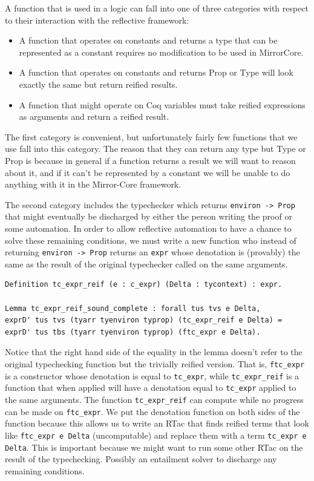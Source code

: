 \documentclass{puthesis}
\begin{document}
A function that is used in a logic can fall into one of three
categories with respect to their interaction with the reflective
framework:

\begin{itemize}
\item A function that operates on constants and returns a type that
  can be represented as a constant requires no modification to be used
  in MirrorCore.
\item A function that operates on constants and returns Prop or Type
  will look exactly the same but return reified results.
\item A function that might operate on Coq variables must take reified
  expressions as arguments and return a reified result.
\end{itemize}

The first category is convenient, but unfortunately fairly few
functions that we use fall into this category. The reason that they
can return any type but Type or Prop is because in general if a
function returns a result we will want to reason about it, and if it
can't be represented by a constant we will be unable to do anything
with it in the Mirror-Core framework.

The second category includes the typechecker which returns
\lstinline|environ -> Prop| that might eventually be discharged by
either the person writing the proof or some automation.  In order to
allow reflective automation to have a chance to solve these remaining
conditions, we must write a new function who instead of returning
\lstinline|environ -> Prop| returns an \lstinline|expr| whose
denotation is (provably) the same as the result of the original
typechecker called on the same arguments.

\begin{verbatim}
Definition tc_expr_reif (e : c_expr) (Delta : tycontext) : expr.

Lemma tc_expr_reif_sound_complete : forall tus tvs e Delta,
exprD' tus tvs (tyarr tyenviron typrop) (tc_expr_reif e Delta) =
exprD' tus tbs (tyarr tyenviron typrop) (ftc_expr e Delta).
\end{verbatim}

Notice that the right hand side of the equality in the lemma doesn't
refer to the original typechecking function but the trivially reified
version. That is, \lstinline|ftc_expr| is a constructor whose
denotation is equal to \lstinline|tc_expr|, while
\lstinline|tc_expr_reif| is a function that when applied will have a
denotation equal to \lstinline|tc_expr| applied to the same
arguments. The function \lstinline|tc_expr_reif| can compute while no
progress can be made on \lstinline|ftc_expr|.  We put the denotation
function on both sides of the function because this allows us to write
an RTac that finds reified terms that look like \lstinline|ftc_expr e Delta|
(uncomputable) and replace them with a term 
\lstinline|tc_expr e Delta|. This is important because we might want to run some other
RTac on the result of the typechecking. Possibly an entailment solver
to discharge any remaining conditions.
\end{document}
